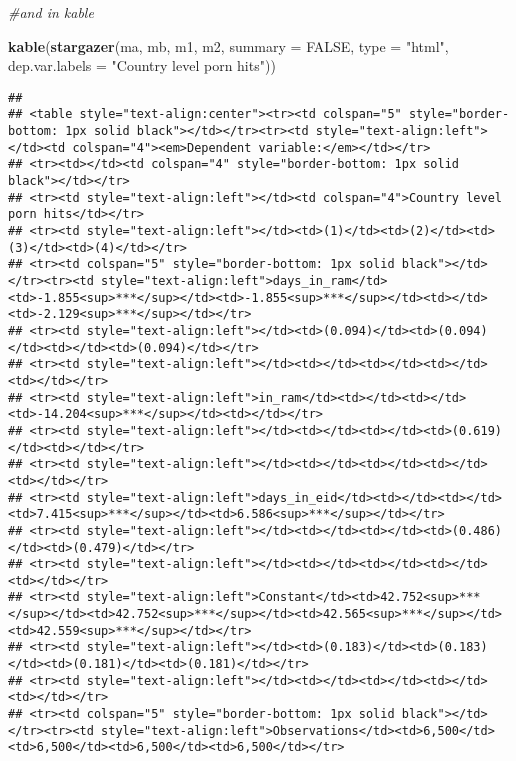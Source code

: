 \documentclass[]{article}
\newenvironment{Shaded}{\begin{snugshade}}{\end{snugshade}}
\newcommand{\KeywordTok}[1]{\textcolor[rgb]{0.13,0.29,0.53}{\textbf{#1}}}
\newcommand{\DataTypeTok}[1]{\textcolor[rgb]{0.13,0.29,0.53}{#1}}
\newcommand{\StringTok}[1]{\textcolor[rgb]{0.31,0.60,0.02}{#1}}
\newcommand{\CommentTok}[1]{\textcolor[rgb]{0.56,0.35,0.01}{\textit{#1}}}
\newcommand{\OtherTok}[1]{\textcolor[rgb]{0.56,0.35,0.01}{#1}}
\newcommand{\NormalTok}[1]{#1}
\begin{document}
\begin{Shaded}
\begin{Highlighting}[]
\CommentTok{#and in kable}

\KeywordTok{kable}\NormalTok{(}\KeywordTok{stargazer}\NormalTok{(ma, mb, m1, m2, }\DataTypeTok{summary =} \OtherTok{FALSE}\NormalTok{, }\DataTypeTok{type =} \StringTok{"html"}\NormalTok{, }\DataTypeTok{dep.var.labels =} \StringTok{"Country level porn hits"}\NormalTok{))}
\end{Highlighting}
\end{Shaded}

\begin{verbatim}
## 
## <table style="text-align:center"><tr><td colspan="5" style="border-bottom: 1px solid black"></td></tr><tr><td style="text-align:left"></td><td colspan="4"><em>Dependent variable:</em></td></tr>
## <tr><td></td><td colspan="4" style="border-bottom: 1px solid black"></td></tr>
## <tr><td style="text-align:left"></td><td colspan="4">Country level porn hits</td></tr>
## <tr><td style="text-align:left"></td><td>(1)</td><td>(2)</td><td>(3)</td><td>(4)</td></tr>
## <tr><td colspan="5" style="border-bottom: 1px solid black"></td></tr><tr><td style="text-align:left">days_in_ram</td><td>-1.855<sup>***</sup></td><td>-1.855<sup>***</sup></td><td></td><td>-2.129<sup>***</sup></td></tr>
## <tr><td style="text-align:left"></td><td>(0.094)</td><td>(0.094)</td><td></td><td>(0.094)</td></tr>
## <tr><td style="text-align:left"></td><td></td><td></td><td></td><td></td></tr>
## <tr><td style="text-align:left">in_ram</td><td></td><td></td><td>-14.204<sup>***</sup></td><td></td></tr>
## <tr><td style="text-align:left"></td><td></td><td></td><td>(0.619)</td><td></td></tr>
## <tr><td style="text-align:left"></td><td></td><td></td><td></td><td></td></tr>
## <tr><td style="text-align:left">days_in_eid</td><td></td><td></td><td>7.415<sup>***</sup></td><td>6.586<sup>***</sup></td></tr>
## <tr><td style="text-align:left"></td><td></td><td></td><td>(0.486)</td><td>(0.479)</td></tr>
## <tr><td style="text-align:left"></td><td></td><td></td><td></td><td></td></tr>
## <tr><td style="text-align:left">Constant</td><td>42.752<sup>***</sup></td><td>42.752<sup>***</sup></td><td>42.565<sup>***</sup></td><td>42.559<sup>***</sup></td></tr>
## <tr><td style="text-align:left"></td><td>(0.183)</td><td>(0.183)</td><td>(0.181)</td><td>(0.181)</td></tr>
## <tr><td style="text-align:left"></td><td></td><td></td><td></td><td></td></tr>
## <tr><td colspan="5" style="border-bottom: 1px solid black"></td></tr><tr><td style="text-align:left">Observations</td><td>6,500</td><td>6,500</td><td>6,500</td><td>6,500</td></tr>

\end{verbatim}
\end{document}
